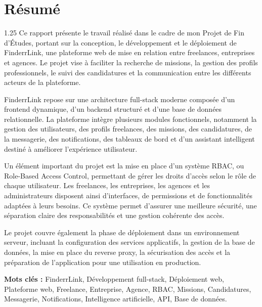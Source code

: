 \section*{\Huge Résumé}

\vspace{0.7cm}

\begin{spacing}{1.25}
Ce rapport présente le travail réalisé dans le cadre de mon Projet de Fin d’Études, portant sur la conception, le développement et le déploiement de FinderrLink, une plateforme web de mise en relation entre freelances, entreprises et agences. Le projet vise à faciliter la recherche de missions, la gestion des profils professionnels, le suivi des candidatures et la communication entre les différents acteurs de la plateforme.

FinderrLink repose sur une architecture full-stack moderne composée d’un frontend dynamique, d’un backend structuré et d’une base de données relationnelle. La plateforme intègre plusieurs modules fonctionnels, notamment la gestion des utilisateurs, des profils freelances, des missions, des candidatures, de la messagerie, des notifications, des tableaux de bord et d’un assistant intelligent destiné à améliorer l’expérience utilisateur.

Un élément important du projet est la mise en place d’un système RBAC, ou Role-Based Access Control, permettant de gérer les droits d’accès selon le rôle de chaque utilisateur. Les freelances, les entreprises, les agences et les administrateurs disposent ainsi d’interfaces, de permissions et de fonctionnalités adaptées à leurs besoins. Ce système permet d’assurer une meilleure sécurité, une séparation claire des responsabilités et une gestion cohérente des accès.

Le projet couvre également la phase de déploiement dans un environnement serveur, incluant la configuration des services applicatifs, la gestion de la base de données, la mise en place du reverse proxy, la sécurisation des accès et la préparation de l’application pour une utilisation en production.
\end{spacing}

\vspace{0.4cm}
\noindent \textbf{Mots clés :} FinderrLink, Développement full-stack, Déploiement web, Plateforme web, Freelance, Entreprise, Agence, RBAC, Missions, Candidatures, Messagerie, Notifications, Intelligence artificielle, API, Base de données.
